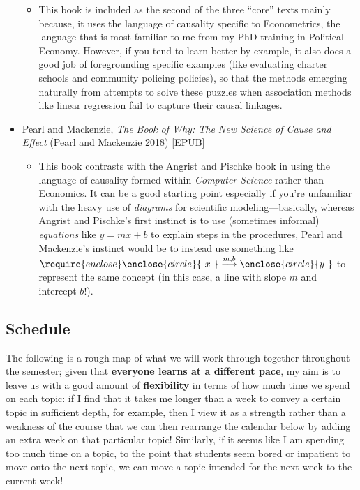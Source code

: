 \documentclass[
]{scrartcl}
\providecommand{\tightlist}{%
  \setlength{\itemsep}{0pt}\setlength{\parskip}{0pt}}\usepackage{longtable,booktabs,array}
\begin{document}
\begin{itemize}
  \begin{itemize}
  \tightlist
  \item
    This book is included as the second of the three ``core'' texts
    mainly because, it uses the language of causality specific to
    Econometrics, the language that is most familiar to me from my PhD
    training in Political Economy. However, if you tend to learn better
    by example, it also does a good job of foregrounding specific
    examples (like evaluating charter schools and community policing
    policies), so that the methods emerging naturally from attempts to
    solve these puzzles when association methods like linear regression
    fail to capture their causal linkages.
  \end{itemize}
\item
  Pearl and Mackenzie, \emph{The Book of Why: The New Science of Cause
  and Effect} (Pearl and Mackenzie 2018)
  {[}\href{https://www.dropbox.com/scl/fi/0r7kg7hwibztvfnby8vdg/The-Book-of-Why.epub?rlkey=czdiw5mku5uamjdiwyyzlpmdr&dl=1}{EPUB}{]}

  \begin{itemize}
  \tightlist
  \item
    This book contrasts with the Angrist and Pischke book in using the
    language of causality formed within \emph{Computer Science} rather
    than Economics. It can be a good starting point especially if you're
    unfamiliar with the heavy use of \emph{diagrams} for scientific
    modeling---basically, whereas Angrist and Pischke's first instinct
    is to use (sometimes informal) \emph{equations} like \(y = mx + b\)
    to explain steps in the procedures, Pearl and Mackenzie's instinct
    would be to instead use something like
    \(\require{enclose}\enclose{circle}{\kern .01em ~x~\kern .01em} \overset{\small m, b}{\longrightarrow} \enclose{circle}{\kern.01em y~\kern .01em}\)
    to represent the same concept (in this case, a line with slope \(m\)
    and intercept \(b\)!).
  \end{itemize}
\end{itemize}

\subsection{Schedule}\label{schedule}

The following is a rough map of what we will work through together
throughout the semester; given that \textbf{everyone learns at a
different pace}, my aim is to leave us with a good amount of
\textbf{flexibility} in terms of how much time we spend on each topic:
if I find that it takes me longer than a week to convey a certain topic
in sufficient depth, for example, then I view it as a strength rather
than a weakness of the course that we can then rearrange the calendar
below by adding an extra week on that particular topic! Similarly, if it
seems like I am spending too much time on a topic, to the point that
students seem bored or impatient to move onto the next topic, we can
move a topic intended for the next week to the current week!
\end{document}
